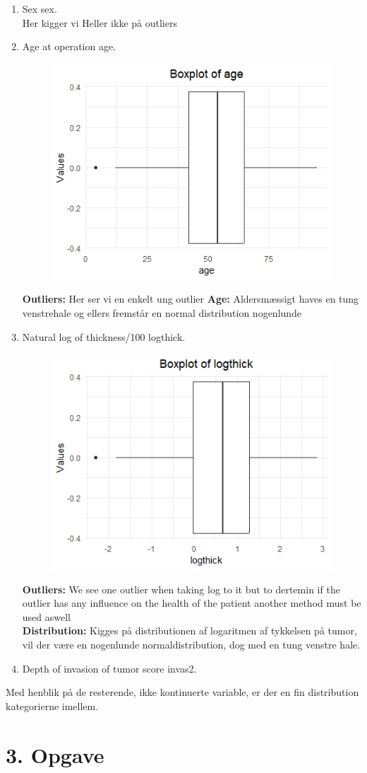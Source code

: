 \begin{enumerate}
\item Sex sex.\\
Her kigger vi Heller ikke på outliers
\item Age at operation age.
\newline
\begin{figure}[h]
    \centering
    \includegraphics[width=0.6\linewidth]{Basses_kode/Billeder_duration/Outliers_age.jpeg}
\end{figure}
\textbf{Outliers: }Her ser vi en enkelt ung outlier 
\textbf{Age: } Aldersmæssigt haves en tung venstrehale og ellers fremstår en normal distribution nogenlunde
\newpage
\item Natural log of thickness/100 logthick.
\newline
\begin{figure}[h]
    \centering
    \includegraphics[width=0.6\linewidth]{Basses_kode/Billeder_duration/Outliers_logthick.jpeg}
\end{figure}
\textbf{Outliers: }We see one outlier when taking log to it but to dertemin if the outlier has any influence on the health of the patient another method must be used aswell\\
\textbf{Distribution: }Kigges på distributionen af logaritmen af tykkelsen på tumor, vil der være en nogenlunde normaldistribution, dog med en tung venstre hale.
\item Depth of invasion of tumor score invas2.
\end{enumerate}

Med henblik på de resterende, ikke kontinuerte variable, er der en fin distribution kategorierne imellem.



\chapter{3. Opgave}
